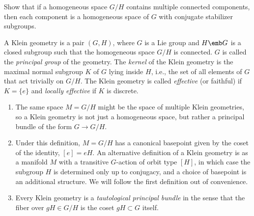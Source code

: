 \begin{xca}
    Show that if a homogeneous space $G\slash H$ contains multiple connected components, then each component is a homogeneous space of $G$ with conjugate stabilizer subgroups.
\end{xca}

\begin{defn}
    A Klein geometry is a pair $(G,H)$, where $G$ is a Lie group and $H\emb G$ is a closed subgroup such that the homogeneous space $G\slash H$ is connected. $G$ is called the \emph{principal group} of the geometry. The \emph{kernel} of the Klein geometry is the maximal normal subgroup $K$ of $G$ lying inside $H$, i.e., the set of all elements of $G$ that act trivially on $G\slash H$. The Klein geometry is called \emph{effective} (or faithful) if $K=\{e\}$ and \emph{locally effective} if $K$ is discrete. 
\end{defn}

\begin{rem}
    \begin{enumerate}
        \item The same space $M=G\slash H$ might be the space of multiple Klein geometries, so a Klein geometry is not  just a homogeneous space, but rather a principal bundle of the form $G\to G\slash H$. 
        \item Under this definition, $M=G\slash H$ has a canonical basepoint given by the coset of the identity, $[e]=eH$. An alternative definition of a Klein geometry is as a manifold $M$ with a transitive $G$-action of orbit type $[H]$, in which case the subgroup $H$ is determined only up to conjugacy, and a choice of basepoint is an additional structure. We will follow the first definition out of convenience.
        \item Every Klein geometry is a \emph{tautological principal bundle} in the sense that the fiber over $gH\in G\slash H$ is the coset $gH\subset G$ itself. 
    \end{enumerate}
\end{rem}



